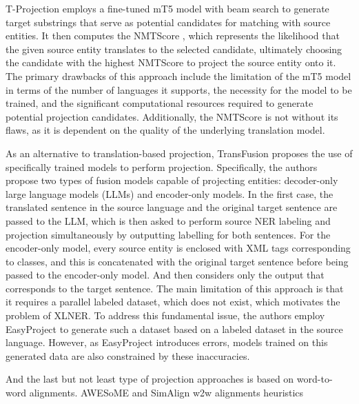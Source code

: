T-Projection \cite{garcia-ferrero-etal-2023-projection} employs a fine-tuned mT5 \cite{xue-etal-2021-mt5}
model with beam search to generate target substrings that serve as potential candidates for matching
with source entities. It then computes the NMTScore \cite{vamvas_sennrich_2022_nmtscore}, which
represents the likelihood that the given source entity translates to the selected candidate, ultimately
choosing the candidate with the highest NMTScore to project the source entity onto it. The primary
drawbacks of this approach include the limitation of the mT5 model in terms of the number of languages
it supports, the necessity for the model to be trained, and the significant computational resources
required to generate potential projection candidates. Additionally, the NMTScore is not without its
flaws, as it is dependent on the quality of the underlying translation model.

As an alternative to translation-based projection, TransFusion \cite{transfusion} proposes the use of
specifically trained models to perform projection. Specifically, the authors propose two types of fusion
models capable of projecting entities: decoder-only large language models (LLMs) and encoder-only models.
In the first case, the translated sentence in the source language and the original target sentence are
passed to the LLM, which is then asked to perform source NER labeling and projection simultaneously
by outputting labelling for both sentences. For the encoder-only model, every source entity is enclosed
with XML tags corresponding to classes, and this is concatenated with the original target sentence
before being passed to the encoder-only model. And then considers only the output that corresponds to the
target sentence. The main limitation of this approach is that it requires a parallel labeled dataset,
which does not exist, which motivates the problem of XLNER. To address this fundamental issue, the
authors employ EasyProject to generate such a dataset based on a labeled dataset in the source
language. However, as EasyProject introduces errors, models trained on this generated data are also
constrained by these inaccuracies.

And the last but not least type of projection approaches is based on word-to-word alignments.
AWESoME \cite{dou-neubig-2021-word} and SimAlign \cite{jalili-sabet-etal-2020-simalign}
w2w alignments heuristics \cite{garcia-ferrero-etal-2022-model}

